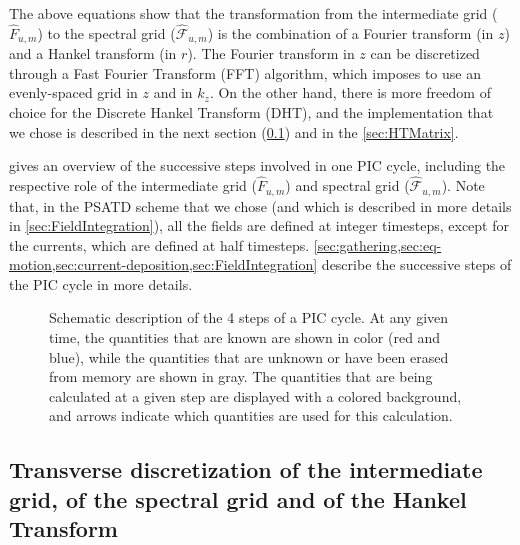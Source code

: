 \documentclass[1p,times]{elsarticle}
\newcommand{\spectral}[1]{\hat{\mathcal{#1}}}
\begin{document}
The above equations show that the transformation from the intermediate
grid ($\hat{F}_{u,m}$) to the spectral grid ($\spectral{F}_{u,m}$) is
the combination of a Fourier transform (in $z$) and a Hankel transform
(in $r$). The Fourier transform in $z$ can be discretized through a Fast Fourier
Transform (FFT) algorithm, which imposes to use an evenly-spaced grid
in $z$ and in $k_z$. On the other hand, there is more freedom of
choice for the Discrete Hankel Transform (DHT), and the implementation that
we chose is described in the next section
(\cref{sec:discretization}) and in the \ref{sec:HTMatrix}.

 gives an overview of the successive steps
involved in one PIC cycle, including the
respective role of the intermediate grid ($\hat{F}_{u,m}$) and
spectral grid ($\spectral{F}_{u,m}$). Note that, in the PSATD
scheme that we chose (and which is described in more details in
\cref{sec:FieldIntegration}), all the fields are defined at integer
timesteps, except for the currents, which are defined at half
timesteps.  
\cref{sec:gathering,sec:eq-motion,sec:current-deposition,sec:FieldIntegration} 
describe the successive steps of the PIC cycle in more details.

\begin{figure}

\caption{\label{fig:GlobalScheme}Schematic description of the 4 steps
  of a PIC
  cycle. At any given time, the quantities that
  are known are shown in color (red and blue), 
while the quantities that are unknown or have been erased from memory 
are shown in gray. The quantities that are being calculated at a given step are
  displayed with a colored background, and arrows indicate which
  quantities are used for this calculation.}
\end{figure}


\subsection{Transverse discretization of the intermediate grid, 
of the spectral grid and of the Hankel Transform}
\label{sec:discretization}
\end{document}
